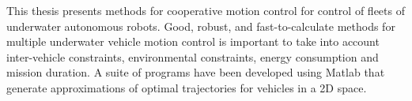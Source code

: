 
\par This thesis presents methods for cooperative motion control for control of fleets of underwater autonomous robots. Good, robust, and fast-to-calculate methods for multiple underwater vehicle motion control is important to take into account inter-vehicle constraints, environmental constraints, energy consumption and mission duration. A suite of programs have been developed using Matlab that generate approximations of optimal trajectories for vehicles in a 2D space. %

